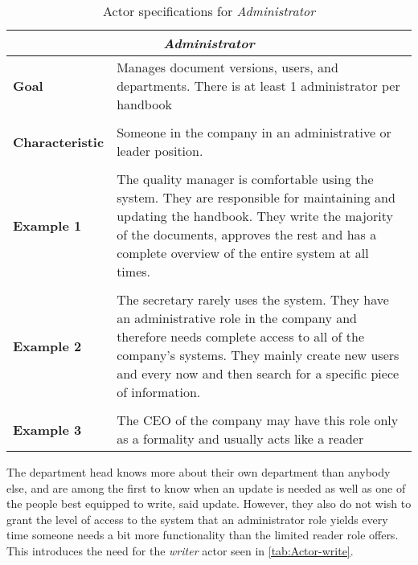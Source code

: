 \begin{table}[H]
	\centering
	\begin{tabular}{l p{11.3cm}}
		\hline
		\multicolumn{2}{c}{\textbf{\textit{Administrator}}}\\
		\hline

		\textbf{Goal} &  Manages document versions, users, and departments. There is at least 1 administrator per handbook\\
		 &  \\

		\textbf{Characteristic} & Someone in the company in an administrative or leader position.\\
		&  \\

		\textbf{Example 1}
		& The quality manager is comfortable using the system.
		They are responsible for maintaining and updating the handbook.
		They write the majority of the documents, approves the rest and has a complete overview of the entire system at all times. \\
		&  \\

		\textbf{Example 2}
		& The secretary rarely uses the system.
		They have an administrative role in the company and therefore needs complete access to all of the company's systems.
		They mainly create new users and every now and then search for a specific piece of information.\\
		&  \\

		\textbf{Example 3}
		& The CEO of the company may have this role only as a formality and usually acts like a reader\\
		\hline
	\end{tabular}
\caption{Actor specifications for \textit{Administrator}}\label{tab:Actor-admin}
\end{table}

The department head knows more about their own department than anybody else, and are among the first to know when an update is needed as well as one of the people best equipped to write, said update.
However, they also do not wish to grant the level of access to the system that an administrator role yields every time someone needs a bit more functionality than the limited reader role offers.
This introduces the need for the \textit{writer} actor seen in \cref{tab:Actor-write}.

